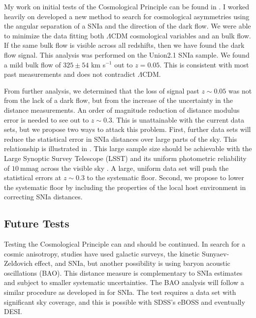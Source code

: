 \documentclass[apj, iop]{emulateapj}
\newcommand{\sn}{SNIa}
\newcommand{\lcdm}{$\Lambda$CDM}     %
\begin{document}
My work on initial tests of the Cosmological Principle can be found in
\cite{Mathews16}. I worked heavily on developed a new method to search for
cosmological asymmetries using the angular separation of a \sn{} and the
direction of the dark flow. We were able to minimize the data fitting both
\lcdm{} cosmological variables and  an bulk flow. If the same bulk flow is
visible across all redshifts, then we have found the dark flow signal. This
analysis was performed on the Union2.1 \citep{Suzuki12} \sn{} sample. We found a
mild bulk flow of $325 \pm 54$ km s$^{-1}$ out to $z = 0.05$. This is consistent
with most past measurements and does not contradict \lcdm{}.

From further analysis, we determined that the loss of signal past $z \sim 0.05$
was not from the lack of a dark flow, but from the increase of the uncertainty
in the distance measurements. An order of magnitude reduction of distance
modulus error is needed to see out to $z \sim 0.3$. This is unattainable with
the current data sets, but we propose two ways to attack this problem. First,
further data sets will reduce the statistical error in \sn{} distances over
large parts of the sky. This relationship is illustrated in .
This large sample size should be achievable with the Large Synoptic Survey
Telescope (LSST) and its uniform photometric reliability of $10 ~\text{mmag}$
across the visible sky \citep{Ivezic08}. A large, uniform data set will push the
statistical errors at $z\sim 0.3$ to the systematic floor. Second, we propose to
lower the systematic floor by including the properties of the local host
environment in correcting \sn{} distances.

\subsection{Future Tests}\label{future-tests}

Testing the Cosmological Principle can and should be continued. In search for a
cosmic anisotropy, studies have used galactic surveys, the kinetic Sunyaev-
Zel\'dovich effect, and SNIa, but another possibility is using baryon acoustic
oscillations (BAO). This distance measure is complementary to \sn{} estimates
and subject to smaller systematic uncertainties.
The BAO analysis will follow a similar procedure as developed in
\cite{Mathews16} for SNIa. The test requires a
data set with significant sky coverage, and this is possible with SDSS's eBOSS
and eventually DESI.

\end{document}
